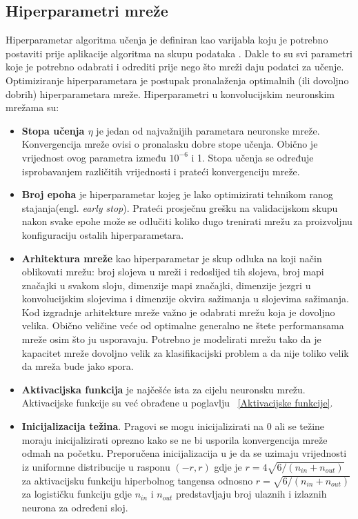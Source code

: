 \documentclass[times, utf8, zavrsni, numeric]{fer}
\begin{document}
\subsection{Hiperparametri mreže}
Hiperparametar algoritma učenja je definiran kao varijabla koju je potrebno postaviti prije aplikacije algoritma na skupu podataka \citep{bengio2012practical}. Dakle to su svi parametri koje je potrebno odabrati i odrediti prije nego što mreži daju podatci za učenje. Optimiziranje hiperparametara je postupak pronalaženja optimalnih (ili dovoljno dobrih) hiperparametara mreže. Hiperparametri u konvolucijskim neuronskim mrežama su:
\begin{itemize}
\renewcommand\labelitemi{$\bullet$}
\item \textbf{Stopa učenja $\eta$} je jedan od najvažnijih parametara neuronske mreže. Konvergencija mreže ovisi o pronalasku dobre stope učenja. Obično je vrijednost ovog parametra između $10^{-6}$ i 1. Stopa učenja se određuje isprobavanjem različitih vrijednosti i prateći konvergenciju mreže.

\item \textbf{Broj epoha} je hiperparametar kojeg je lako optimizirati tehnikom ranog stajanja(engl. \textit{early stop}). Prateći prosječnu grešku na validacijskom skupu nakon svake epohe može se odlučiti koliko dugo trenirati mrežu za proizvoljnu konfiguraciju ostalih hiperparametara.

\item \textbf{Arhitektura mreže} kao hiperparametar je skup odluka na koji način oblikovati mrežu: broj slojeva u mreži i redoslijed tih slojeva, broj mapi značajki u svakom sloju, dimenzije mapi značajki,
dimenzije jezgri u konvolucijskim slojevima i dimenzije okvira sažimanja u slojevima sažimanja. Kod izgradnje arhitekture mreže važno je odabrati mrežu koja je dovoljno velika. Obično veličine veće od optimalne generalno ne štete performansama mreže osim što ju usporavaju. Potrebno je modelirati mrežu tako da je kapacitet mreže dovoljno velik za klasifikacijski problem a da nije toliko velik da mreža bude jako spora.

\item \textbf{Aktivacijska funkcija} je najčešće ista za cijelu neuronsku mrežu. Aktivacijske funkcije su već obrađene u poglavlju ~\ref{Aktivacijske funkcije}. 

\item \textbf{Inicijalizacija težina}. Pragovi se mogu inicijalizirati na 0 ali se težine moraju inicijalizirati oprezno kako se ne bi usporila konvergencija mreže odmah na početku. Preporučena inicijalizacija u \citep{glorot2010understanding} je da se uzimaju vrijednosti iz uniformne distribucije u rasponu $(-r, r)$ gdje je $r = 4\sqrt{6/(n_{in} + n_{out})}$ za aktivacijsku funkciju hiperbolnog tangensa odnosno $r = \sqrt{6/(n_{in} + n_{out})}$ za logističku funkciju gdje $n_{in}$ i $n_{out}$ predstavljaju broj ulaznih i izlaznih neurona za određeni sloj.


\end{itemize}
\end{document}
